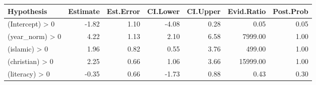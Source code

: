\begin{tabular}{lrrrrrr}
\toprule
Hypothesis & Estimate & Est.Error & CI.Lower & CI.Upper & Evid.Ratio & Post.Prob \\
\midrule
(Intercept) > 0 & -1.82 & 1.10 & -4.08 & 0.28 & 0.05 & 0.05 \\
(year_norm) > 0 & 4.22 & 1.13 & 2.10 & 6.58 & 7999.00 & 1.00 \\
(islamic) > 0 & 1.96 & 0.82 & 0.55 & 3.76 & 499.00 & 1.00 \\
(christian) > 0 & 2.25 & 0.66 & 1.06 & 3.66 & 15999.00 & 1.00 \\
(literacy) > 0 & -0.35 & 0.66 & -1.73 & 0.88 & 0.43 & 0.30 \\
\bottomrule
\end{tabular}
